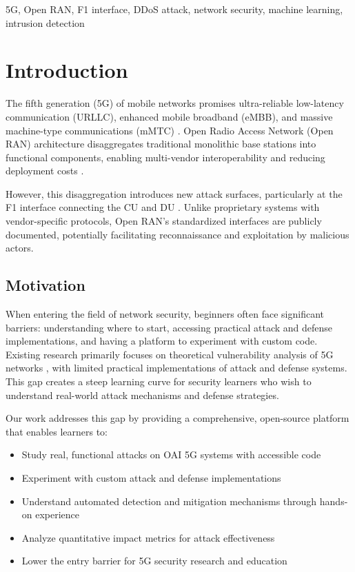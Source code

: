 \documentclass[conference]{IEEEtran}
\begin{document}
\begin{IEEEkeywords}
5G, Open RAN, F1 interface, DDoS attack, network security, machine learning, intrusion detection
\end{IEEEkeywords}

\section{Introduction}

The fifth generation (5G) of mobile networks promises ultra-reliable low-latency communication (URLLC), enhanced mobile broadband (eMBB), and massive machine-type communications (mMTC) \cite{3gpp-38.470}. Open Radio Access Network (Open RAN) architecture disaggregates traditional monolithic base stations into functional components, enabling multi-vendor interoperability and reducing deployment costs \cite{oran-alliance}.

However, this disaggregation introduces new attack surfaces, particularly at the F1 interface connecting the CU and DU \cite{security-oran}. Unlike proprietary systems with vendor-specific protocols, Open RAN's standardized interfaces are publicly documented, potentially facilitating reconnaissance and exploitation by malicious actors.

\subsection{Motivation}

When entering the field of network security, beginners often face significant barriers: understanding where to start, accessing practical attack and defense implementations, and having a platform to experiment with custom code. Existing research primarily focuses on theoretical vulnerability analysis of 5G networks \cite{survey-5g-security}, with limited practical implementations of attack and defense systems. This gap creates a steep learning curve for security learners who wish to understand real-world attack mechanisms and defense strategies.

Our work addresses this gap by providing a comprehensive, open-source platform that enables learners to:
\begin{itemize}
    \item Study real, functional attacks on OAI 5G systems with accessible code
    \item Experiment with custom attack and defense implementations
    \item Understand automated detection and mitigation mechanisms through hands-on experience
    \item Analyze quantitative impact metrics for attack effectiveness
    \item Lower the entry barrier for 5G security research and education
\end{itemize}
\end{document}
